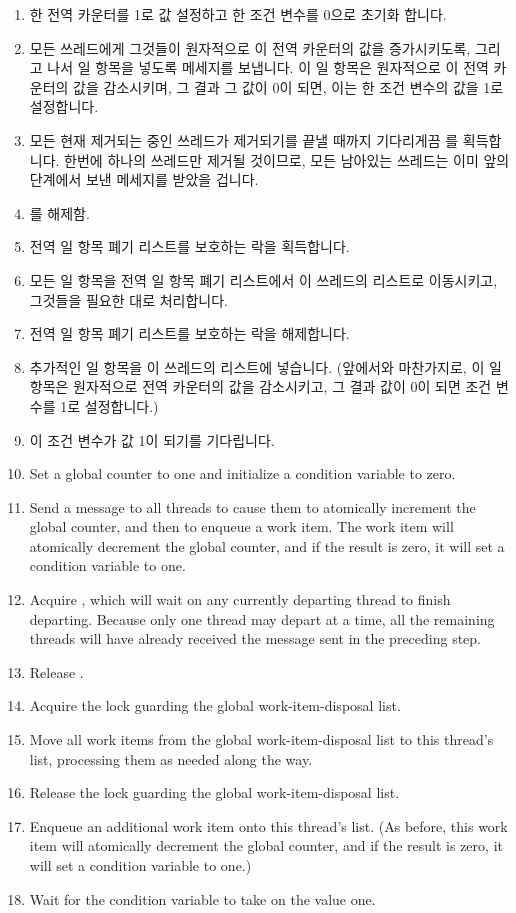 {	\fi

	\begin{enumerate}
	\item	한 전역 카운터를 1로 값 설정하고 한 조건 변수를 0으로 초기화
		합니다.
	\item	모든 쓰레드에게 그것들이 원자적으로 이 전역 카운터의 값을
		증가시키도록, 그리고 나서 일 항목을 넣도록 메세지를 보냅니다.
		이 일 항목은 원자적으로 이 전역 카운터의 값을 감소시키며, 그
		결과 그 값이 0이 되면, 이는 한 조건 변수의 값을 1로 설정합니다.
	\item	모든 현재 제거되는 중인 쓰레드가 제거되기를 끝낼 때까지
		기다리게끔  를 획득합니다.
		한번에 하나의 쓰레드만 제거될 것이므로, 모든 남아있는 쓰레드는
		이미 앞의 단계에서 보낸 메세지를 받았을 겁니다.
	\item	{} 를 해제함.
	\item	전역 일 항목 폐기 리스트를 보호하는 락을 획득합니다.
	\item	모든 일 항목을 전역 일 항목 폐기 리스트에서 이 쓰레드의
		리스트로 이동시키고, 그것들을 필요한 대로 처리합니다.
	\item	전역 일 항목 폐기 리스트를 보호하는 락을 해제합니다.
	\item	추가적인 일 항목을 이 쓰레드의 리스트에 넣습니다.
		(앞에서와 마찬가지로, 이 일 항목은 원자적으로 전역 카운터의
		값을 감소시키고, 그 결과 값이 0이 되면 조건 변수를 1로
		설정합니다.)
	\item	이 조건 변수가 값 1이 되기를 기다립니다.

	\iffalse

	\item	Set a global counter to one and initialize a condition
		variable to zero.
	\item	Send a message to all threads to cause them to atomically
		increment the global counter, and then to enqueue a
		work item.
		The work item will atomically decrement the global
		counter, and if the result is zero, it will set a
		condition variable to one.
	\item	Acquire , which will wait on any currently departing
		thread to finish departing.
		Because only one thread may depart at a time, all the
		remaining threads will have already received the message
		sent in the preceding step.
	\item	Release .
	\item	Acquire the lock guarding the global work-item-disposal list.
	\item	Move all work items from the global work-item-disposal list
		to this thread's list, processing them as needed along the way.
	\item	Release the lock guarding the global work-item-disposal list.
	\item	Enqueue an additional work item onto this thread's list.
		(As before, this work item will atomically decrement
		the global counter, and if the result is zero, it will
		set a condition variable to one.)
	\item	Wait for the condition variable to take on the value one.


\end{enumerate}}
